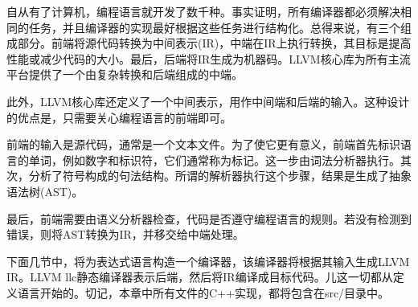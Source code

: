 自从有了计算机，编程语言就开发了数千种。事实证明，所有编译器都必须解决相同的任务，并且编译器的实现最好根据这些任务进行结构化。总得来说，有三个组成部分。前端将源代码转换为中间表示(IR)，中端在IR上执行转换，其目标是提高性能或减少代码的大小。最后，后端将IR生成为机器码。LLVM核心库为所有主流平台提供了一个由复杂转换和后端组成的中端。

此外，LLVM核心库还定义了一个中间表示，用作中间端和后端的输入。这种设计的优点是，只需要关心编程语言的前端即可。

前端的输入是源代码，通常是一个文本文件。为了使它更有意义，前端首先标识语言的单词，例如数字和标识符，它们通常称为标记。这一步由词法分析器执行。其次，分析了符号构成的句法结构。所谓的解析器执行这个步骤，结果是生成了抽象语法树(AST)。

最后，前端需要由语义分析器检查，代码是否遵守编程语言的规则。若没有检测到错误，则将AST转换为IR，并移交给中端处理。

下面几节中，将为表达式语言构造一个编译器，该编译器将根据其输入生成LLVM IR。LLVM llc静态编译器表示后端，然后将IR编译成目标代码。儿这一切都从定义语言开始的。切记，本章中所有文件的C++实现，都将包含在src/目录中。